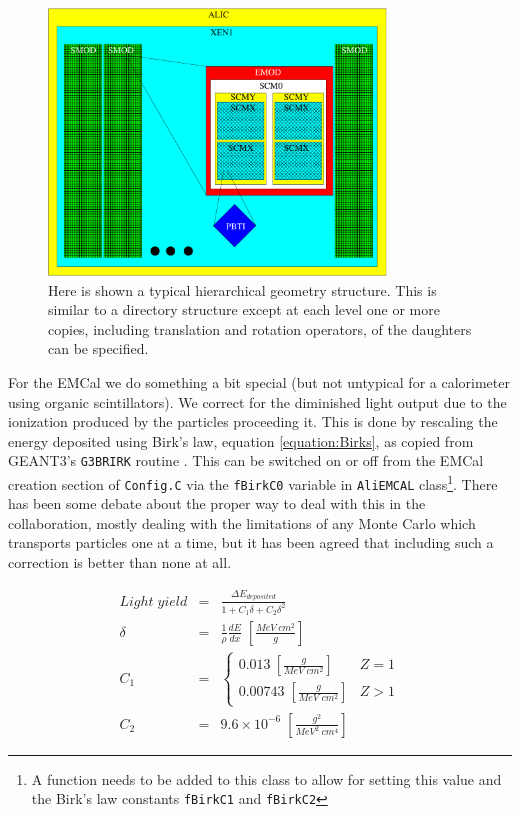 \begin{figure}[ht]
\begin{center}
\includegraphics[width=0.8\textwidth]{figures/EMCalGeometryStructure.pdf}
\end{center}
\caption{\label{fig:GeometryDirectory}
Here is shown a typical hierarchical geometry structure. This
is similar to a directory structure except at each level one or
more copies, including translation and rotation operators, of
the daughters can be specified.}
\end{figure}

For the EMCal we do something a bit special (but not untypical
for a calorimeter using organic scintillators). We correct for 
the diminished light output
due to the ionization produced by the particles proceeding it.
This is done by rescaling the energy deposited using Birk's
law, equation \ref{equation:Birks}, as copied from GEANT3's 
\texttt{G3BRIRK} routine 
\cite{GEANT3:documentatoin}. This can be switched on or off
from the EMCal creation section of \texttt{Config.C} via
the \texttt{fBirkC0} variable in \texttt{AliEMCAL} class\footnote{
A function needs to be added to this class to allow for setting
this value and the Birk's law constants \texttt{fBirkC1}
and \texttt{fBirkC2}}.  There has been 
some debate about the proper way to deal with this in the
collaboration, mostly dealing with the limitations of any
Monte Carlo which transports particles one at a time, but
it has been agreed that including such a correction is
better than none at all.

\begin{eqnarray}
Light\; yield & = & 
 \frac{\Delta E_{deposited}}{1+C_1 \delta + C_2 \delta^2} 
\label{equation:Birks} \\
\delta & = & 
 \frac{1}{\rho}\frac{dE}{dx}\; \left[\frac{MeV\: cm^{2}}{g}\right]\nonumber \\
C_{1} & = & \left\{ \begin{array}{ll}
                    0.013\: \left[\frac{g}{MeV\;cm^{2}}\right] & Z=1 \\
                    0.00743\; \left[\frac{g}{MeV\; cm^{2}}\right] & 
                                         Z>1 \end{array}\right.\nonumber \\
C_{2} & = & 9.6\times 10^{-6}\; 
                  \left[\frac{g^{2}}{MeV^{2}\: cm^{4}}\right] \nonumber
\end{eqnarray}

